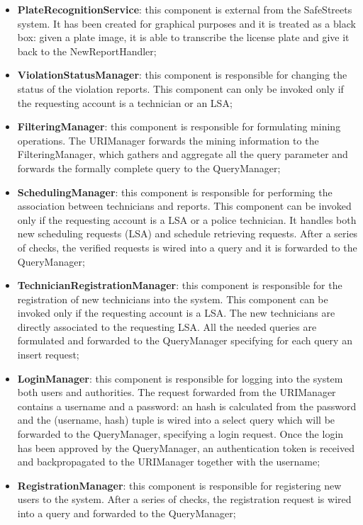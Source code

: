 \begin{itemize}
    \item \textbf{PlateRecognitionService}: this component is external from the SafeStreets system. It has been created for graphical purposes and it is treated as a black box: given a plate image, it is able to transcribe the license plate and give it back to the NewReportHandler;
    \item \textbf{ViolationStatusManager}: this component is responsible for changing the status of the violation reports. This component can only be invoked only if the requesting account is a technician or an LSA;
    \item \textbf{FilteringManager}: this component is responsible for formulating mining operations. The URIManager forwards the mining information to the FilteringManager, which gathers and aggregate all the query parameter and forwards the formally complete query to the QueryManager;
    \item \textbf{SchedulingManager}: this component is responsible for performing the association between technicians and reports. This component can be invoked only if the requesting account is a LSA or a police technician. It handles both new scheduling requests (LSA) and schedule retrieving requests. After a series of checks, the verified requests is wired into a query and it is forwarded to the QueryManager;
    \item \textbf{TechnicianRegistrationManager}: this component is responsible for the registration of new technicians into the system. This component can be invoked only if the requesting account is a LSA. The new technicians are directly associated to the requesting LSA. All the needed queries are formulated and forwarded to the QueryManager specifying for each query an insert request;
    \item \textbf{LoginManager}: this component is responsible for logging into the system both users and authorities. The request forwarded from the URIManager contains a username and a password: an hash is calculated from the password and the (username, hash) tuple is wired into a select query which will be forwarded to the QueryManager, specifying a login request. Once the login has been approved by the QueryManager, an authentication token is received and backpropagated to the URIManager together with the username;
    \item \textbf{RegistrationManager}: this component is responsible for registering new users to the system. After a series of checks, the registration request is wired into a query and forwarded to the QueryManager;

\end{itemize}
